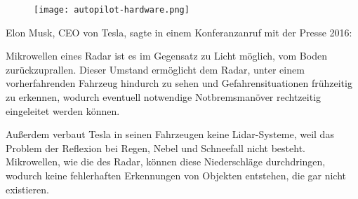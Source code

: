 \begin{figure}\centering
  \texttt{[image: autopilot-hardware.png]}
  \label{autopilot-hardware}
\end{figure}

\noindent Elon Musk, CEO von Tesla, sagte in einem Konferanzanruf mit der Presse 2016: 

Mikrowellen eines \acs{Radar} ist es im Gegensatz zu Licht möglich, vom Boden zurückzuprallen. Dieser Umstand ermöglicht dem \acs{Radar}, unter einem vorherfahrenden Fahrzeug hindurch zu sehen und Gefahrensituationen frühzeitig zu erkennen, wodurch eventuell notwendige Notbremsmanöver rechtzeitig eingeleitet werden können. 

Außerdem verbaut Tesla in seinen Fahrzeugen keine \acs{Lidar}-Systeme, weil das Problem der Reflexion bei Regen, Nebel und Schneefall nicht besteht. Mikrowellen, wie die des \acs{Radar}, können diese Niederschläge durchdringen, wodurch keine fehlerhaften Erkennungen von Objekten entstehen, die gar nicht existieren. 
